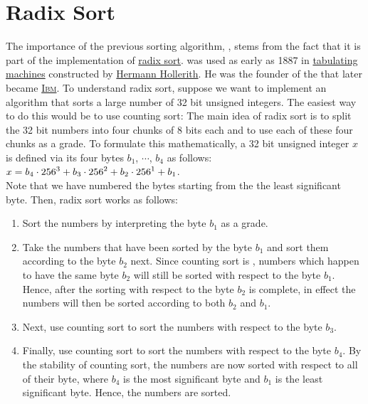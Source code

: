 \section{Radix Sort}
The importance of the previous sorting algorithm, , stems from the fact that it is part of the
implementation of \href{https://en.wikipedia.org/wiki/Radix_sort}{radix sort}. 
 was used as early as 1887 in 
\href{https://en.wikipedia.org/wiki/Tabulating_machine}{tabulating machines} constructed by
\href{https://en.wikipedia.org/wiki/Herman_Hollerith}{Hermann Hollerith}.   He was the founder of
the  that later became \href{https://en.wikipedia.org/wiki/IBM}{\textsc{Ibm}}.
To understand radix sort, suppose we want to implement an algorithm that sorts a large number of 32 bit
unsigned integers.  The easiest way to do this would be to use counting sort:
The main idea of radix sort is to split the
32 bit numbers into four chunks of 8 bits each and to use each of these four chunks as a grade.  To formulate this
mathematically, a 32 bit unsigned integer $x$ is defined via its four bytes $b_1$, $\cdots$, $b_4$ as follows:
\\[0.2cm]
\hspace*{1.3cm}
$\displaystyle x = b_4 \cdot 256^{3} + b_3 \cdot 256^{2} + b_2 \cdot 256^{1} + b_1$.
\\[0.2cm]
Note that we have numbered the bytes starting from the the least significant byte.
Then, radix sort works as follows:
\begin{enumerate}
\item Sort the numbers by interpreting the byte $b_1$ as a grade.
\item Take the numbers that have been sorted by the byte $b_1$ and sort them according to the byte $b_2$ next.
      Since counting sort is , numbers which happen to have the same byte $b_2$ will still be
      sorted with respect to the byte $b_1$.  Hence, after the sorting with respect to the byte $b_2$ is
      complete, in effect the numbers will then be sorted according to both $b_2$ and $b_1$.
\item Next, use counting sort to sort the numbers with respect to the byte $b_3$.
\item Finally, use counting sort to sort the numbers with respect to the byte $b_4$.  By the stability of
      counting sort, the numbers are now sorted with respect to all of their byte, where $b_4$ is the most
      significant byte and $b_1$ is the least significant byte. Hence, the numbers are sorted. 
\end{enumerate}


